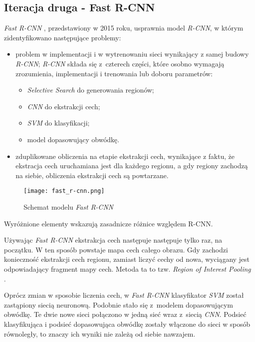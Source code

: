 \subsection{Iteracja druga - Fast R-CNN}

\textit{Fast R-CNN} \cite{fast-rcnn}, przedstawiony w 2015 roku, usprawnia model \textit{R-CNN}, w którym zidentyfikowano następujące problemy:

\begin{itemize}
  \item problem w implementacji i w wytrenowaniu sieci wynikający z samej budowy \textit{R-CNN}; \textit{R-CNN} składa się z~czterech części, które osobno wymagają zrozumienia, implementacji i trenowania lub doboru parametrów:
		\begin{itemize}
			\item \textit{Selective Search} do generowania regionów;
			\item \textit{CNN} do ekstrakcji cech;
			\item \textit{SVM} do klasyfikacji;
			\item model dopasowujący obwódkę.
		\end{itemize}
  \item zduplikowane obliczenia na etapie ekstrakcji cech, wynikające z faktu, że ekstracja cech uruchamiana jest dla każdego regionu, a gdy regiony zachodzą na siebie, obliczenia ekstrakcji cech są powtarzane.
\end{itemize}

\begin{figure}[h]
  \centering
  \caption{Schemat modelu \textit{Fast R-CNN}}
  \texttt{[image: fast\_r-cnn.png]}
  \label{fig:fast_r_cnn}
\end{figure}

Wyróżnione elementy wskazują zasadnicze różnice względem R-CNN.

Używając \textit{Fast R-CNN} ekstrakcja cech następuje następuje tylko raz, na początku.
W ten sposób powstaje mapa cech całego obrazu.
Gdy zachodzi konieczność ekstrakcji cech regionu, zamiast liczyć cechy od nowa, wyciągany jest odpowiadający fragment mapy cech.
Metoda ta to tzw. \textit{Region of Interest Pooling} \cite{region-of-interest-pooling}.

Oprócz zmian w sposobie liczenia cech, w \textit{Fast R-CNN} klasyfikator \textit{SVM} został zastąpiony siecią neuronową.
Podobnie stało się z~modelem dopasowującym obwódkę.
Te dwie nowe sieci połączono w jedną sieć wraz z~siecią \textit{CNN}.
Podsieć klasyfikująca i podsieć dopasowująca obwódkę zostały włączone do sieci w sposób równoległy, to znaczy ich wyniki nie zależą od siebie nawzajem.

